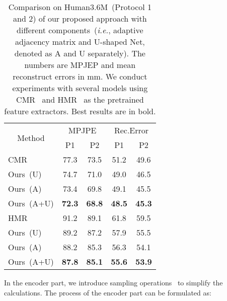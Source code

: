 \documentclass[sigplan]{acmart}
\def\ie{\emph{i.e.}}
\begin{document}
\begin{table}[!t]
\caption{Comparison on Human3.6M~(Protocol 1 and 2) of our proposed approach with different components~(\ie, adaptive adjacency matrix and U-shaped Net, denoted as A and U separately). The numbers are MPJEP and mean reconstruct errors in mm. We conduct experiments with several models using CMR~\cite{kolotouros2019convolutional} and HMR~\cite{kanazawa2018end-to-end} as the pretrained feature extractors. Best results are in bold.}
\centering
\begin{tabular}{ccccccccccccccc}
\hline
\multicolumn{3}{c|}{\multirow{2}{*}{Method}} & \multicolumn{6}{c|}{MPJPE}                    & \multicolumn{6}{c}{Rec.Error} \\ 
\cline{4-15} 
\multicolumn{3}{c|}{}                        & \multicolumn{3}{c}{P1} & \multicolumn{3}{c|}{P2} & \multicolumn{3}{c}{P1} & \multicolumn{3}{c}{P2} \\ \hline
\multicolumn{3}{l|}{CMR~\cite{kolotouros2019convolutional}}                        &  \multicolumn{3}{c}{77.3}      & \multicolumn{3}{c|}{73.5}              & \multicolumn{3}{c}{51.2}      & \multicolumn{3}{c}{49.6}  \\
\multicolumn{3}{l|}{Ours~(U)}                        &  \multicolumn{3}{c}{{74.7}}      & \multicolumn{3}{c|}{71.0}              & \multicolumn{3}{c}{49.0}      & \multicolumn{3}{c}{46.5}  \\
\multicolumn{3}{l|}{Ours~(A)}                        &  \multicolumn{3}{c}{{73.4}}      & \multicolumn{3}{c|}{69.8}              & \multicolumn{3}{c}{49.1}      & \multicolumn{3}{c}{45.5}  \\
\multicolumn{3}{l|}{Ours~(A+U)}                        &  \multicolumn{3}{c}{\textbf{72.3}}      & \multicolumn{3}{c|}{\textbf{68.8}}              & \multicolumn{3}{c}{\textbf{48.5}}      & \multicolumn{3}{c}{\textbf{45.3}}  \\\hline
\multicolumn{3}{l|}{HMR~\cite{kanazawa2018end-to-end}}                        &  \multicolumn{3}{c}{91.2}      & \multicolumn{3}{c|}{89.1}              & \multicolumn{3}{c}{61.8}      & \multicolumn{3}{c}{59.5}  \\
\multicolumn{3}{l|}{Ours~(U)}                        &  \multicolumn{3}{c}{{89.2}}      & \multicolumn{3}{c|}{87.2}              & \multicolumn{3}{c}{57.9}      & \multicolumn{3}{c}{55.5}  \\
\multicolumn{3}{l|}{Ours~(A)}                        &  \multicolumn{3}{c}{{88.2}}      & \multicolumn{3}{c|}{85.3}              & \multicolumn{3}{c}{56.3}      & \multicolumn{3}{c}{54.1}  \\

\multicolumn{3}{l|}{Ours~(A+U)}                        &  \multicolumn{3}{c}{\textbf{87.8}}      & \multicolumn{3}{c|}{\textbf{85.1}}              & \multicolumn{3}{c}{\textbf{55.6}}      & \multicolumn{3}{c}{\textbf{53.9}} \\
\hline
\end{tabular}
\label{table4Component}
\end{table}
In the encoder part, we introduce sampling operations~\cite{GenerateFaceEccv18} to simplify the calculations. The process of the encoder part can be formulated as: 
\end{document}
